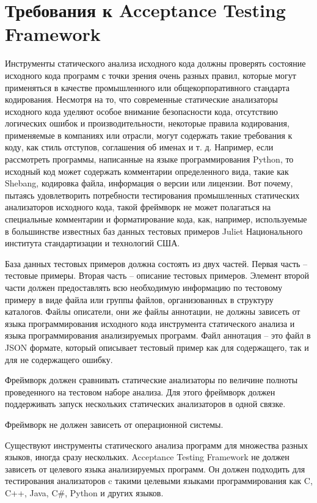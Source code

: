 \section{Требования к Acceptance Testing Framework}\label{sec:ch2/sect2}
Инструменты статического анализа исходного кода должны проверять состояние исходного кода программ с точки зрения очень разных правил, которые
могут применяться в качестве промышленного или общекорпоративного стандарта кодирования. Несмотря на то, что современные статические анализаторы
исходного кода уделяют особое внимание безопасности кода, отсутствию логических ошибок и производительности, некоторые правила кодирования, применяемые в компаниях или отрасли, могут содержать такие требования к коду, как
стиль отступов, соглашения об именах и т. д. Например, если рассмотреть
программы, написанные на языке программирования Python, то исходный код может содержать комментарии определенного вида, такие как Shebang, кодировка файла, информация о версии или лицензии. 
Вот почему, пытаясь удовлетворить потребности тестирования промышленных статических анализаторов исходного кода, такой фреймворк не может полагаться на специальные комментарии и форматирование кода, как, например, используемые в большинстве известных баз данных тестовых примеров Juliet Национального
института стандартизации и технологий США. %

База данных тестовых примеров должна состоять из двух частей. Первая часть -- тестовые примеры. Вторая часть -- описание тестовых примеров. 
Элемент второй части должен предоставлять всю необходимую информацию по тестовому примеру в виде файла или группы файлов, организованных в структуру каталогов. Файлы описатели, они же файлы аннотации, не должны зависеть от языка программирования исходного кода инструмента статического анализа и языка программирования анализируемых программ. 
Файл аннотация -- это файл в JSON формате, который описывает тестовый пример как для содержащего, так и для не содержащего ошибку.

Фреймворк должен сравнивать статические анализаторы по величине полноты проведенного на тестовом наборе анализа.
Для этого фреймворк должен поддерживать запуск нескольких статических анализаторов в одной связке. 

Фреймворк не должен зависеть от операционной системы. 

Существуют инструменты статического анализа программ для множества
разных языков, иногда сразу нескольких. Acceptance Testing Framework не должен
зависеть от целевого языка анализируемых программ. Он должен подходить для
тестирования анализаторов c такими целевыми языками программирования как C,
C++, Java, C\#, Python и других языков.

